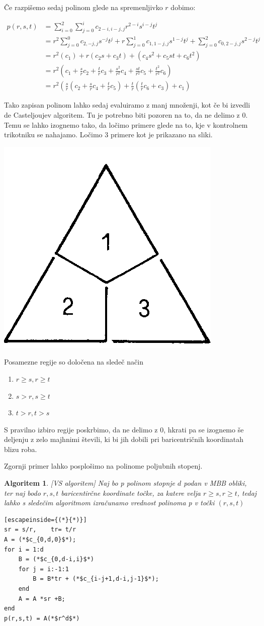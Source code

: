 \documentclass{article}
\newtheorem{algoritm}{Algoritem}[section]
\begin{document}
Če razpišemo sedaj polinom glede na spremenljivko $r$ dobimo:

\begin{align}
p(r,s,t) &= \sum_{i=0}^{2}\sum_{j=0}^{i}c_{2-i,i-j,j}r^{2-i}s^{i-j}t^j \nonumber \\ \nonumber
&= r^2\sum_{j=0}^{0}c_{2,-j,j}s^{-j}t^j + r\sum_{j=0}^{1}c_{1,1-j,j}s^{1-j}t^j + \sum_{j=0}^{2}c_{0,2-j,j}s^{2-j}t^j \\ \nonumber
&= r^2(c_1) + r(c_2s+c_3t) + (c_4s^2+c_5st+c_6t^2)\\ \nonumber
&= r^2(c_1+\frac{s}{r}c_2+\frac{t}{r}c_3+\frac{s^2}{r^2}c_4+\frac{st}{r^2}c_5+\frac{t^2}{r^2}c_6) \\ \nonumber
&= r^2(\frac{s}{r}(c_2+\frac{s}{r}c_4+\frac{t}{r}c_5)+\frac{t}{r}(\frac{t}{r}c_6+c_3)+c_1) \nonumber
\end{align}

Tako zapisan polinom lahko sedaj evaluiramo z manj množenji, kot če bi izvedli de Casteljoujev algoritem.
Tu je potrebno biti pozoren na to, da ne delimo z $0$. Temu se lahko izognemo tako, da ločimo primere glede na to, kje v kontrolnem trikotniku se nahajamo. Ločimo $3$ primere kot je prikazano na sliki.

\begin{center}
\includegraphics[width=.3\linewidth]{graf1.png}
\end{center}
Posamezne regije so določena na sledeč način
\begin{enumerate}
\item  $r \geq s, r \geq t$
\item $s > r, s \geq t$
\item $t>r, t>s$
\end{enumerate}

S pravilno izbiro regije poskrbimo, da ne delimo z $0$, hkrati pa se izognemo še deljenju z zelo majhnimi števili, ki bi jih dobili pri baricentričnih koordinatah blizu roba.

Zgornji primer lahko posplošimo na polinome poljubnih stopenj.

\begin{algoritm}
\label{MBB}[VS algoritem]
Naj bo p polinom stopnje $d$ podan v MBB obliki, ter naj bodo $ r,s,t$ baricentirčne koordinate točke, za katere velja $r \geq s,r \geq t$, tedaj lahko s sledečim algoritmom izračunamo vrednost polinoma p v točki $(r,s,t)$
\begin{lstlisting}[escapeinside={(*}{*)}]
sr = s/r,	 tr= t/r
A = (*$c_{0,d,0}$*);
for i = 1:d
    B = (*$c_{0,d-i,i}$*)
    for j = i:-1:1
        B = B*tr + (*$c_{i-j+1,d-i,j-1}$*);
    end
    A = A *sr +B;
end
p(r,s,t) = A(*$r^d$*)
\end{lstlisting}
\end{algoritm}
\end{document}
